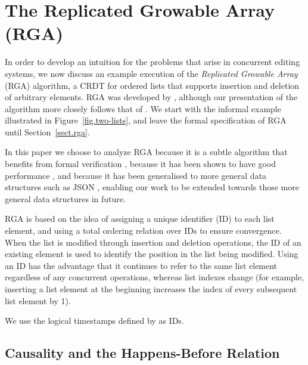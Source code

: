 \section{The Replicated Growable Array (RGA)}\label{sect.rga.background}

In order to develop an intuition for the problems that arise in concurrent editing systems, we now
discuss an example execution of the \emph{Replicated Growable Array} (RGA) algorithm, a CRDT for
ordered lists that supports insertion and deletion of arbitrary elements. RGA was developed by
\citet{Roh:2011dw}, although our presentation of the algorithm more closely follows that of
\citet{Shapiro:2011wy}. We start with the informal example illustrated in
Figure~\ref{fig.two-lists}, and leave the formal specification of RGA until Section~\ref{sect.rga}.

In this paper we
choose to analyze RGA because it is a subtle algorithm that benefits from formal verification
\cite{Attiya:2016kh}, because it has been shown to have good performance \cite{Mehdi:2011ke}, and
because it has been generalised to more general data structures such as JSON
\cite{Kleppmann:2016ve}, enabling our work to be extended towards those more general data structures
in future.

RGA is based on the idea of assigning a unique identifier (ID) to each list element, and using a
total ordering relation over IDs to ensure convergence. When the list is modified through insertion
and deletion operations, the ID of an existing element is used to identify the position in the list
being modified. Using an ID has the advantage that it continues to refer to the same list element
regardless of any concurrent operations, whereas list indexes change (for example, inserting a list
element at the beginning increases the index of every subsequent list element by 1).

We use the logical timestamps defined by \citet{Lamport:1978jq} as IDs.


\subsection{Causality and the Happens-Before Relation}\label{sect.causality}

